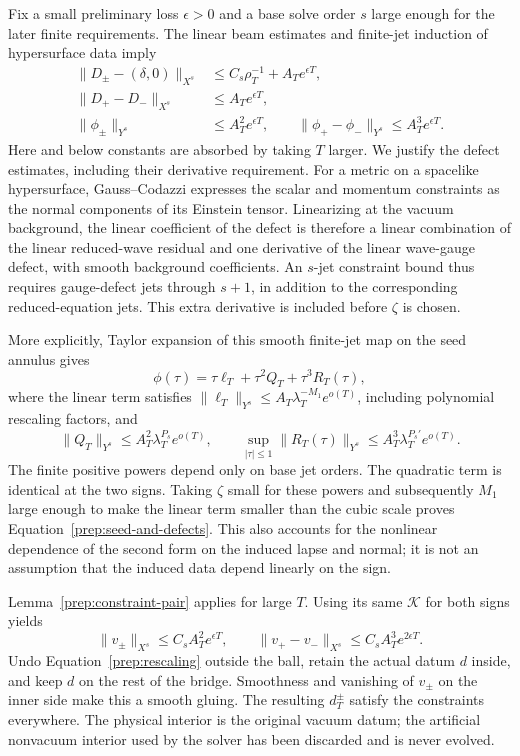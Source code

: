 Fix a small preliminary loss $\epsilon>0$ and a base solve order
$s$ large enough for the later finite requirements.  The linear
beam estimates and finite-jet induction of hypersurface data imply
\begin{equation}\label{prep:seed-and-defects}
 \begin{split}
 \|D_\pm-(\delta,0)\|_{X^s}
        &\le C_s\rho_T^{-1}+A_Te^{\epsilon T},\\
 \|D_+-D_-\|_{X^s}&\le A_Te^{\epsilon T},\\
 \|\phi_\pm\|_{Y^s}&\le A_T^2e^{\epsilon T},\qquad
 \|\phi_+-\phi_-\|_{Y^s}\le A_T^3e^{\epsilon T}.
 \end{split}
\end{equation}
Here and below constants are absorbed by taking $T$ larger.  We
justify the defect estimates, including their derivative requirement.
For a metric on a spacelike hypersurface, Gauss--Codazzi expresses
the scalar and momentum constraints as the normal components of
its Einstein tensor.  Linearizing at the vacuum background, the
linear coefficient of the defect is therefore a linear combination
of the linear reduced-wave residual and one derivative of the linear
wave-gauge defect, with smooth background coefficients.  An $s$-jet
constraint bound thus requires gauge-defect jets through $s+1$,
in addition to the corresponding reduced-equation jets.  This
extra derivative is included before $\zeta$ is chosen.

More explicitly, Taylor expansion of this smooth finite-jet map
on the seed annulus gives
\[
 \phi(\tau)=\tau\ell_T+\tau^2Q_T+\tau^3R_T(\tau),
\]
where the linear term satisfies
$\|\ell_T\|_{Y^s}\le A_T\lambda_T^{-M_1}e^{o(T)}$, including
polynomial rescaling factors, and
\[
 \|Q_T\|_{Y^s}\le A_T^2\lambda_T^{P_s}e^{o(T)},\qquad
 \sup_{|\tau|\le1}\|R_T(\tau)\|_{Y^s}
           \le A_T^3\lambda_T^{P_s'}e^{o(T)}.
\]
The finite positive powers depend only on base jet orders.  The
quadratic term is identical at the two signs.  Taking $\zeta$
small for these powers and subsequently $M_1$ large enough to make
the linear term smaller than the cubic scale proves
Equation~\eqref{prep:seed-and-defects}.  This also accounts for the
nonlinear dependence of the second form on the induced lapse and
normal; it is not an assumption that the induced data depend
linearly on the sign.

Lemma~\ref{prep:constraint-pair} applies for large $T$.  Using its
same $\mathcal K$ for both signs yields
\begin{equation}\label{prep:correction-sizes}
 \|v_\pm\|_{X^s}\le C_s A_T^2e^{\epsilon T},\qquad
 \|v_+-v_-\|_{X^s}\le C_s A_T^3e^{2\epsilon T}.
\end{equation}
Undo Equation~\eqref{prep:rescaling} outside the ball, retain the
actual datum $d$ inside, and keep $d$ on the rest of the bridge.
Smoothness and vanishing of $v_\pm$ on the inner side make this a
smooth gluing.  The resulting $d_T^\pm$ satisfy the constraints
everywhere.  The physical interior is the original vacuum datum;
the artificial nonvacuum interior used by the solver has been
discarded and is never evolved.

